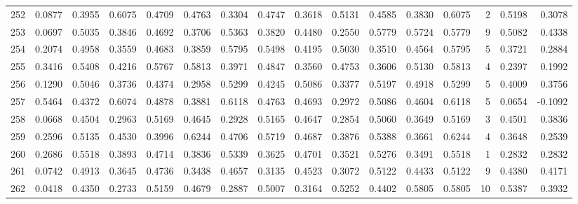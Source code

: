\begin{tabular}{lrrrrrrrrrrrrrrr}
252 &      0.0877 &  0.3955 &  0.6075 &  0.4709 &  0.4763 &  0.3304 &  0.4747 &  0.3618 &  0.5131 &  0.4585 &   0.3830 &     0.6075 &      2 &                    0.5198 &                     0.3078 \\
253 &      0.0697 &  0.5035 &  0.3846 &  0.4692 &  0.3706 &  0.5363 &  0.3820 &  0.4480 &  0.2550 &  0.5779 &   0.5724 &     0.5779 &      9 &                    0.5082 &                     0.4338 \\
254 &      0.2074 &  0.4958 &  0.3559 &  0.4683 &  0.3859 &  0.5795 &  0.5498 &  0.4195 &  0.5030 &  0.3510 &   0.4564 &     0.5795 &      5 &                    0.3721 &                     0.2884 \\
255 &      0.3416 &  0.5408 &  0.4216 &  0.5767 &  0.5813 &  0.3971 &  0.4847 &  0.3560 &  0.4753 &  0.3606 &   0.5130 &     0.5813 &      4 &                    0.2397 &                     0.1992 \\
256 &      0.1290 &  0.5046 &  0.3736 &  0.4374 &  0.2958 &  0.5299 &  0.4245 &  0.5086 &  0.3377 &  0.5197 &   0.4918 &     0.5299 &      5 &                    0.4009 &                     0.3756 \\
257 &      0.5464 &  0.4372 &  0.6074 &  0.4878 &  0.3881 &  0.6118 &  0.4763 &  0.4693 &  0.2972 &  0.5086 &   0.4604 &     0.6118 &      5 &                    0.0654 &                    -0.1092 \\
258 &      0.0668 &  0.4504 &  0.2963 &  0.5169 &  0.4645 &  0.2928 &  0.5165 &  0.4647 &  0.2854 &  0.5060 &   0.3649 &     0.5169 &      3 &                    0.4501 &                     0.3836 \\
259 &      0.2596 &  0.5135 &  0.4530 &  0.3996 &  0.6244 &  0.4706 &  0.5719 &  0.4687 &  0.3876 &  0.5388 &   0.3661 &     0.6244 &      4 &                    0.3648 &                     0.2539 \\
260 &      0.2686 &  0.5518 &  0.3893 &  0.4714 &  0.3836 &  0.5339 &  0.3625 &  0.4701 &  0.3521 &  0.5276 &   0.3491 &     0.5518 &      1 &                    0.2832 &                     0.2832 \\
261 &      0.0742 &  0.4913 &  0.3645 &  0.4736 &  0.3438 &  0.4657 &  0.3135 &  0.4523 &  0.3072 &  0.5122 &   0.4433 &     0.5122 &      9 &                    0.4380 &                     0.4171 \\
262 &      0.0418 &  0.4350 &  0.2733 &  0.5159 &  0.4679 &  0.2887 &  0.5007 &  0.3164 &  0.5252 &  0.4402 &   0.5805 &     0.5805 &     10 &                    0.5387 &                     0.3932 \\

\end{tabular}
